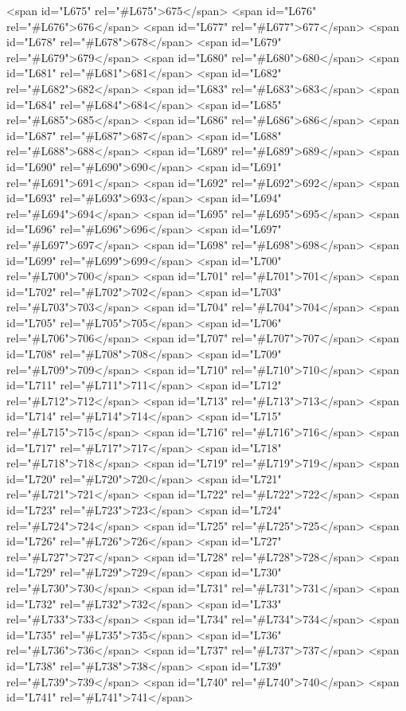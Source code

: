<span id="L675" rel="#L675">675</span>
<span id="L676" rel="#L676">676</span>
<span id="L677" rel="#L677">677</span>
<span id="L678" rel="#L678">678</span>
<span id="L679" rel="#L679">679</span>
<span id="L680" rel="#L680">680</span>
<span id="L681" rel="#L681">681</span>
<span id="L682" rel="#L682">682</span>
<span id="L683" rel="#L683">683</span>
<span id="L684" rel="#L684">684</span>
<span id="L685" rel="#L685">685</span>
<span id="L686" rel="#L686">686</span>
<span id="L687" rel="#L687">687</span>
<span id="L688" rel="#L688">688</span>
<span id="L689" rel="#L689">689</span>
<span id="L690" rel="#L690">690</span>
<span id="L691" rel="#L691">691</span>
<span id="L692" rel="#L692">692</span>
<span id="L693" rel="#L693">693</span>
<span id="L694" rel="#L694">694</span>
<span id="L695" rel="#L695">695</span>
<span id="L696" rel="#L696">696</span>
<span id="L697" rel="#L697">697</span>
<span id="L698" rel="#L698">698</span>
<span id="L699" rel="#L699">699</span>
<span id="L700" rel="#L700">700</span>
<span id="L701" rel="#L701">701</span>
<span id="L702" rel="#L702">702</span>
<span id="L703" rel="#L703">703</span>
<span id="L704" rel="#L704">704</span>
<span id="L705" rel="#L705">705</span>
<span id="L706" rel="#L706">706</span>
<span id="L707" rel="#L707">707</span>
<span id="L708" rel="#L708">708</span>
<span id="L709" rel="#L709">709</span>
<span id="L710" rel="#L710">710</span>
<span id="L711" rel="#L711">711</span>
<span id="L712" rel="#L712">712</span>
<span id="L713" rel="#L713">713</span>
<span id="L714" rel="#L714">714</span>
<span id="L715" rel="#L715">715</span>
<span id="L716" rel="#L716">716</span>
<span id="L717" rel="#L717">717</span>
<span id="L718" rel="#L718">718</span>
<span id="L719" rel="#L719">719</span>
<span id="L720" rel="#L720">720</span>
<span id="L721" rel="#L721">721</span>
<span id="L722" rel="#L722">722</span>
<span id="L723" rel="#L723">723</span>
<span id="L724" rel="#L724">724</span>
<span id="L725" rel="#L725">725</span>
<span id="L726" rel="#L726">726</span>
<span id="L727" rel="#L727">727</span>
<span id="L728" rel="#L728">728</span>
<span id="L729" rel="#L729">729</span>
<span id="L730" rel="#L730">730</span>
<span id="L731" rel="#L731">731</span>
<span id="L732" rel="#L732">732</span>
<span id="L733" rel="#L733">733</span>
<span id="L734" rel="#L734">734</span>
<span id="L735" rel="#L735">735</span>
<span id="L736" rel="#L736">736</span>
<span id="L737" rel="#L737">737</span>
<span id="L738" rel="#L738">738</span>
<span id="L739" rel="#L739">739</span>
<span id="L740" rel="#L740">740</span>
<span id="L741" rel="#L741">741</span>
